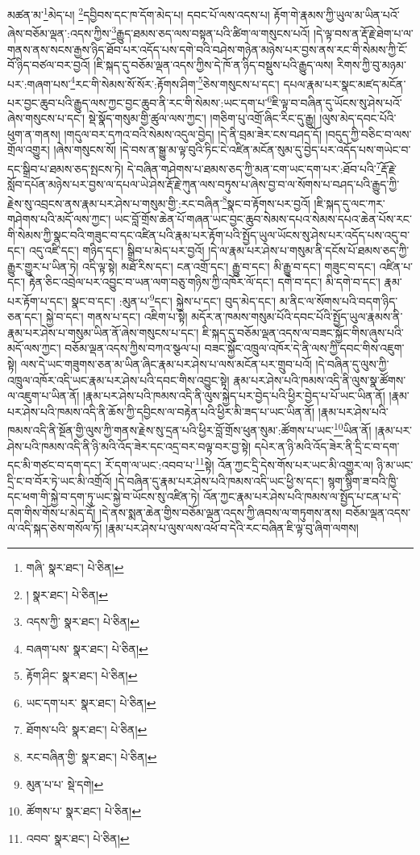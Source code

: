མཚན་མ་\footnote{གཞི་  སྣར་ཐང་།  པེ་ཅིན། }མེད་པ། \footnote{།    སྣར་ཐང་།  པེ་ཅིན། }དབྱིབས་དང་ཁ་དོག་མེད་པ། དབང་པོ་ལས་འདས་པ། རྟོག་གེ་རྣམས་ཀྱི་ཡུལ་མ་ཡིན་པའོ་ཞེས་བཅོམ་ལྡན་:འདས་ཀྱིས་\footnote{འདས་ཀྱི་  སྣར་ཐང་།  པེ་ཅིན། }རྒྱུད་ཐམས་ཅད་ལས་བསྟན་པའི་ཚིག་ལ་གསུངས་པའོ། །དེ་ལྟ་བས་ན་རྡོ་རྗེ་ཐེག་པ་ལ་གནས་ནས་སངས་རྒྱས་ཉིད་ཐོབ་པར་འདོད་པས་དགེ་བའི་བཤེས་གཉེན་མཉེས་པར་བྱས་ནས་རང་གི་སེམས་ཀྱི་ངོ་བོ་ཉིད་བཙལ་བར་བྱའོ། །ཇི་སྐད་དུ་བཅོམ་ལྡན་འདས་ཀྱིས་དེ་ཁོ་ན་ཉིད་བསྡུས་པའི་རྒྱུད་ལས། རིགས་ཀྱི་བུ་མཉམ་པར་:གཞག་པས་\footnote{བཞག་པས་  སྣར་ཐང་།  པེ་ཅིན། }རང་གི་སེམས་སོ་སོར་:རྟོགས་ཤིག་\footnote{རྟོག་ཤིང་  སྣར་ཐང་།  པེ་ཅིན། }ཅེས་གསུངས་པ་དང་། དཔལ་རྣམ་པར་སྣང་མཛད་མངོན་པར་བྱང་ཆུབ་པའི་རྒྱུད་ལས་ཀྱང་བྱང་ཆུབ་ནི་རང་གི་སེམས་:ཡང་དག་པ་\footnote{ཡང་དག་པར་  སྣར་ཐང་།  པེ་ཅིན། }ཇི་ལྟ་བ་བཞིན་དུ་ཡོངས་སུ་ཤེས་པའོ་ཞེས་གསུངས་པ་དང་། སྡེ་སྣོད་གསུམ་གྱི་ཚུལ་ལས་ཀྱང་། །གཅིག་པུ་འགྲོ་ཞིང་རིང་དུ་རྒྱུ། །ལུས་མེད་དབང་པོའི་ཕུག་ན་གནས། །གདུལ་བར་དཀའ་བའི་སེམས་འདུལ་བྱེད། །དེ་ནི་བྲམ་ཟེར་ངས་བཤད་དོ། །བདུད་ཀྱི་བཅིང་བ་ལས་གྲོལ་འགྱུར། །ཞེས་གསུངས་སོ། །དེ་བས་ན་སྒྱུ་མ་ལྟ་བུའི་ཏིང་ངེ་འཛིན་མངོན་སུམ་དུ་བྱེད་པར་འདོད་པས་གཡེང་བ་དང་སྒྲིབ་པ་ཐམས་ཅད་སྤངས་ཏེ། དེ་བཞིན་གཤེགས་པ་ཐམས་ཅད་ཀྱི་མན་ངག་ཡང་དག་པར་:ཐོབ་པའི་\footnote{ཐོགས་པའི་  སྣར་ཐང་།  པེ་ཅིན། }རྡོ་རྗེ་སློབ་དཔོན་མཉེས་པར་བྱས་ལ་དཔལ་ཡེ་ཤེས་རྡོ་རྗེ་ཀུན་ལས་བཏུས་པ་ཞེས་བྱ་བ་ལ་སོགས་པ་བཤད་པའི་རྒྱུད་ཀྱི་རྗེས་སུ་འབྲངས་ནས་རྣམ་པར་ཤེས་པ་གསུམ་གྱི་:རང་བཞིན་\footnote{རང་བཞིན་གྱི་  སྣར་ཐང་།  པེ་ཅིན། }སྣང་བ་རྟོགས་པར་བྱའོ། །ཇི་སྐད་དུ་ལང་ཀར་གཤེགས་པའི་མདོ་ལས་ཀྱང་། ཡང་བློ་གྲོས་ཆེན་པོ་གཞན་ཡང་བྱང་ཆུབ་སེམས་དཔའ་སེམས་དཔའ་ཆེན་པོས་རང་གི་སེམས་ཀྱི་སྣང་བའི་གཟུང་བ་དང་འཛིན་པའི་རྣམ་པར་རྟོག་པའི་སྤྱོད་ཡུལ་ཡོངས་སུ་ཤེས་པར་འདོད་པས་འདུ་བ་དང་། འདུ་འཛི་དང་། གཉིད་དང་། སྒྲིབ་པ་མེད་པར་བྱའོ། །དེ་ལ་རྣམ་པར་ཤེས་པ་གསུམ་ནི་དངོས་པོ་ཐམས་ཅད་ཀྱི་རྒྱུར་གྱུར་པ་ཡིན་ཏེ། འདི་ལྟ་སྟེ། མཐོ་རིས་དང་། ངན་འགྲོ་དང་། རྒྱུ་བ་དང་། མི་རྒྱུ་བ་དང་། གཟུང་བ་དང་། འཛིན་པ་དང་། རྟེན་ཅིང་འབྲེལ་པར་འབྱུང་བ་ཡན་ལག་བཅུ་གཉིས་ཀྱི་འཁོར་ལོ་དང་། དགེ་བ་དང་། མི་དགེ་བ་དང་། རྣམ་པར་རྟོག་པ་དང་། སྣང་བ་དང་། :མུན་པ་\footnote{མུན་པ་པ་  སྡེ་དགེ། }དང་། སྐྱེས་པ་དང་། བུད་མེད་དང་། མ་ནིང་ལ་སོགས་པའི་བདག་ཉིད་ཅན་དང་། སྐྱེ་བ་དང་། གནས་པ་དང་། འཇིག་པ་སྟེ། མདོར་ན་ཁམས་གསུམ་པོའི་དབང་པོའི་སྤྱོད་ཡུལ་རྣམས་ནི་རྣམ་པར་ཤེས་པ་གསུམ་ཡིན་ནོ་ཞེས་གསུངས་པ་དང་། ཇི་སྐད་དུ་བཅོམ་ལྡན་འདས་ལ་བཟང་སྐྱོང་གིས་ཞུས་པའི་མདོ་ལས་ཀྱང་། བཅོམ་ལྡན་འདས་ཀྱིས་བཀའ་སྩལ་པ། བཟང་སྐྱོང་འཁྲུལ་འཁོར་དེ་ནི་ལས་ཀྱི་དབང་གིས་འཇུག་སྟེ། ལས་དེ་ཡང་གཟུགས་ཅན་མ་ཡིན་ཞིང་རྣམ་པར་ཤེས་པ་ལས་མངོན་པར་གྲུབ་པའོ། །དེ་བཞིན་དུ་ལུས་ཀྱི་འཁྲུལ་འཁོར་འདི་ཡང་རྣམ་པར་ཤེས་པའི་དབང་གིས་འབྱུང་སྟེ། རྣམ་པར་ཤེས་པའི་ཁམས་འདི་ནི་ལུས་སྣ་ཚོགས་ལ་འཇུག་པ་ཡིན་ནོ། །རྣམ་པར་ཤེས་པའི་ཁམས་འདི་ནི་ལུས་སྐྱེད་པར་བྱེད་པའི་ཕྱིར་བྱེད་པ་པོ་ཡང་ཡིན་ནོ། །རྣམ་པར་ཤེས་པའི་ཁམས་འདི་ནི་ཆོས་ཀྱི་དབྱིངས་ལ་བརྟེན་པའི་ཕྱིར་མི་ཟད་པ་ཡང་ཡིན་ནོ། །རྣམ་པར་ཤེས་པའི་ཁམས་འདི་ནི་སྔོན་གྱི་ལུས་ཀྱི་གནས་རྗེས་སུ་དྲན་པའི་ཕྱིར་བློ་གྲོས་ཕུན་སུམ་:ཚོགས་པ་ཡང་\footnote{ཚོགས་པ་  སྣར་ཐང་།  པེ་ཅིན། }ཡིན་ནོ། །རྣམ་པར་ཤེས་པའི་ཁམས་འདི་ནི་ཉི་མའི་འོད་ཟེར་དང་འདྲ་བར་བལྟ་བར་བྱ་སྟེ། དཔེར་ན་ཉི་མའི་འོད་ཟེར་ནི་དྲི་ང་བ་དག་དང་མི་གཙང་བ་དག་དང་། རོ་དག་ལ་ཡང་:འབབ་པ་\footnote{འབབ་  སྣར་ཐང་།  པེ་ཅིན། }སྟེ། འོན་ཀྱང་དྲི་དེས་གོས་པར་ཡང་མི་འགྱུར་ལ། ཉི་མ་ཡང་དྲི་ང་བ་བོར་ཏེ་ཡང་མི་འགྲོའོ། །དེ་བཞིན་དུ་རྣམ་པར་ཤེས་པའི་ཁམས་འདི་ཡང་ཕྱི་ས་དང་། སྙག་སྙིག་ཟ་བའི་ཁྱི་དང་ཕག་གི་སྐྱེ་བ་དག་ཏུ་ཡང་སྐྱེ་བ་ཡོངས་སུ་འཛིན་ཏེ། འོན་ཀྱང་རྣམ་པར་ཤེས་པའི་ཁམས་ལ་སྤྱོད་པ་ངན་པ་དེ་དག་གིས་གོས་པ་མེད་དོ། །དེ་ནས་སྨན་ཆེན་གྱིས་བཅོམ་ལྡན་འདས་ཀྱི་ཞབས་ལ་གཏུགས་ནས། བཅོམ་ལྡན་འདས་ལ་འདི་སྐད་ཅེས་གསོལ་ཏོ། །རྣམ་པར་ཤེས་པ་ལུས་ལས་འཕོ་བ་དེའི་རང་བཞིན་ཇི་ལྟ་བུ་ཞིག་ལགས། 